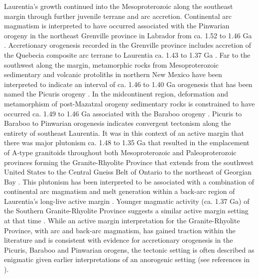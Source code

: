 \documentclass[twocolumn, switch]{article} %
\begin{document}
Laurentia's growth continued into the Mesoproterozoic along the southeast margin through further juvenile terrane and arc accretion. Continental arc magmatism is interpreted to have occurred associated with the Pinwarian orogeny in the northeast Grenville province in Labrador from ca. 1.52 to 1.46 Ga \citep{Gower2002a}. Accretionary orogenesis recorded in the Grenville province includes accretion of the Quebecia composite arc terrane to Laurentia ca. 1.43 to 1.37 Ga \citep{Groulier2020a}. Far to the southwest along the margin, metamorphic rocks from Mesoproterozoic sedimentary and volcanic protoliths in northern New Mexico have been interpreted to indicate an interval of ca. 1.46 to 1.40 Ga orogenesis that has been named the Picuris orogeny \citep{Daniel2013a, Aronoff2016a}. In the midcontinent region,  deformation and metamorphism of post-Mazatzal orogeny sedimentary rocks is constrained to have occurred ca. 1.49 to 1.46 Ga associated with the Baraboo orogeny \citep{Medaris2003a, Holm2019a}. Picuris to Baraboo to Pinwarian orogenesis indicates convergent tectonism along the entirety of southeast Laurentia.  It was in this context of an active margin that there was major plutonism ca. 1.48 to 1.35 Ga that resulted in the emplacement of A-type granitoids throughout both Mesoproterozoic and Paleoproterozoic provinces forming the Granite-Rhyolite Province that extends from the southwest United States to the Central Gneiss Belt of Ontario to the northeast of Georgian Bay \citep{Slagstad2009a}. This plutonism has been interpreted to be associated with a combination of continental arc magmatism and melt generation within a back-arc region of Laurentia's long-live active margin \citep{Bickford2015a}. Younger magmatic activity (ca. 1.37 Ga) of the Southern Granite-Rhyolite Province suggests a similar active margin setting at that time \citep{Bickford2015a}. While an active margin interpretation for the Granite-Rhyolite Province, with arc and back-arc magmatism, has gained traction within the literature and is consistent with evidence for accretionary orogenesis in the Picuris, Baraboo and Pinwarian orogens, the tectonic setting is often described as enigmatic given earlier interpretations of an anorogenic setting (see references in \citealp{Slagstad2009a}).
\end{document}
